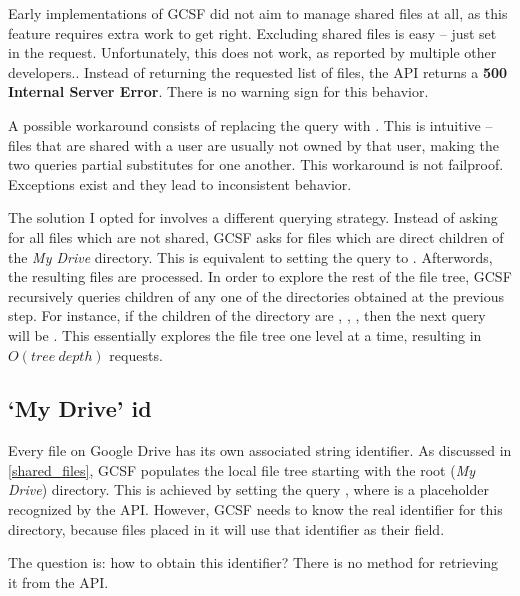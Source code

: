 Early implementations of GCSF did not aim to manage shared files at all, as this feature requires extra work to get right. Excluding shared files is easy -- just set  in the request. Unfortunately, this does not work, as reported by multiple other developers.\cite{shared_with_me_error}\cite{shared_with_me_error2}\cite{shared_with_me_error3}. Instead of returning the requested list of files, the API returns a \textbf{500 Internal Server Error}. There is no warning sign for this behavior.

A possible workaround consists of replacing the query with . This is intuitive -- files that are shared with a user are usually not owned by that user, making the two queries partial substitutes for one another. This workaround is not failproof. Exceptions exist and they lead to inconsistent behavior.

The solution I opted for involves a different querying strategy. Instead of asking for all files which are not shared, GCSF asks for files which are direct children of the \emph{My Drive} directory. This is equivalent to setting the query to . Afterwords, the resulting files are processed. In order to explore the rest of the file tree, GCSF recursively queries children of any one of the directories obtained at the previous step. For instance, if the children of the  directory are , , , then the next query will be . This essentially explores the file tree one level at a time, resulting in $ O(tree~depth) $ requests.

\subsection{`My Drive' id}

Every file on Google Drive has its own associated string identifier. As discussed in \ref{shared_files}, GCSF populates the local file tree starting with the root (\emph{My Drive}) directory. This is achieved by setting the query , where  is a placeholder recognized by the API. However, GCSF needs to know the real identifier for this directory, because files placed in it will use that identifier as their  field.

The question is: how to obtain this identifier? There is no method for retrieving it from the API.

